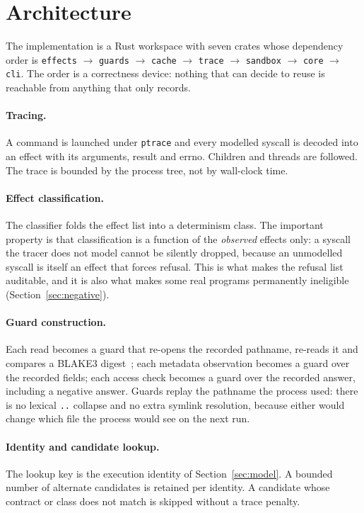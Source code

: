 \section{Architecture}

The implementation is a Rust workspace with seven crates whose dependency order is
\texttt{effects} $\rightarrow$ \texttt{guards} $\rightarrow$ \texttt{cache} $\rightarrow$
\texttt{trace} $\rightarrow$ \texttt{sandbox} $\rightarrow$ \texttt{core} $\rightarrow$
\texttt{cli}. The order is a correctness device: nothing that can decide to reuse is reachable from
anything that only records.

\paragraph{Tracing.}
A command is launched under \texttt{ptrace} and every modelled syscall is decoded into an effect
with its arguments, result and errno. Children and threads are followed. The trace is bounded by
the process tree, not by wall-clock time.

\paragraph{Effect classification.}
The classifier folds the effect list into a determinism class. The important property is that
classification is a function of the \emph{observed} effects only: a syscall the tracer does not
model cannot be silently dropped, because an unmodelled syscall is itself an effect that forces
refusal. This is what makes the refusal list auditable, and it is also what makes some real
programs permanently ineligible (Section~\ref{sec:negative}).

\paragraph{Guard construction.}
Each read becomes a guard that re-opens the recorded pathname, re-reads it and compares a BLAKE3
digest~\cite{blake3}; each metadata observation becomes a guard over the recorded fields; each
access check becomes a guard over the recorded answer, including a negative answer. Guards replay
the pathname the process used: there is no lexical \texttt{..} collapse and no extra symlink
resolution, because either would change which file the process would see on the next run.

\paragraph{Identity and candidate lookup.}
The lookup key is the execution identity of Section~\ref{sec:model}. A bounded number of alternate
candidates is retained per identity. A candidate whose contract or class does not match is skipped
without a trace penalty.

